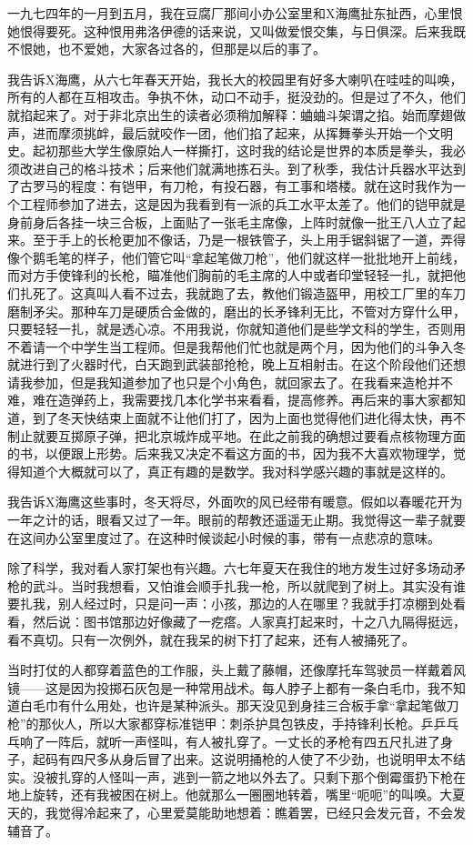 一九七四年的一月到五月，我在豆腐厂那间小办公室里和X海鹰扯东扯西，心里恨她恨得要死。这种恨用弗洛伊德的话来说，又叫做爱恨交集，与日俱深。后来我既不恨她，也不爱她，大家各过各的，但那是以后的事了。 

我告诉X海鹰，从六七年春天开始，我长大的校园里有好多大喇叭在哇哇的叫唤，所有的人都在互相攻击。争执不休，动口不动手，挺没劲的。但是过了不久，他们就掐起来了。对于非北京出生的读者必须稍加解释：蛐蛐斗架谓之掐。始而摩翅做声，进而摩须挑衅，最后就咬作一团，他们掐了起来，从挥舞拳头开始一个文明史。起初那些大学生像原始人一样撕打，这时我的结论是世界的本质是拳头，我必须改进自己的格斗技术；后来他们就满地拣石头。到了秋季，我估计兵器水平达到了古罗马的程度：有铠甲，有刀枪，有投石器，有工事和塔楼。就在这时我作为一个工程师参加了进去，这是因为我看到有一派的兵工水平太差了。他们的铠甲就是身前身后各挂一块三合板，上面贴了一张毛主席像，上阵时就像一批王八人立了起来。至于手上的长枪更加不像话，乃是一根铁管子，头上用手锯斜锯了一道，弄得像个鹅毛笔的样子，他们管它叫“拿起笔做刀枪”，他们就这样一批批地开上前线，而对方手使锋利的长枪，瞄准他们胸前的毛主席的人中或者印堂轻轻一扎，就把他们扎死了。这真叫人看不过去，我就跑了去，教他们锻造盔甲，用校工厂里的车刀磨制矛尖。那种车刀是硬质合金做的，磨出的长矛锋利无比，不管对方穿什么甲，只要轻轻一扎，就是透心凉。不用我说，你就知道他们是些学文科的学生，否则用不着请一个中学生当工程师。但是我帮他们忙也就是两个月，因为他们的斗争入冬就进行到了火器时代，白天跑到武装部抢枪，晚上互相射击。在这个阶段他们还想请我参加，但是我知道参加了也只是个小角色，就回家去了。在我看来造枪并不难，难在造弹药上，我需要找几本化学书来看看，提高修养。再后来的事大家都知道，到了冬天快结束上面就不让他们打了，因为上面也觉得他们进化得太快，再不制止就要互掷原子弹，把北京城炸成平地。在此之前我的确想过要看点核物理方面的书，以便跟上形势。后来我又决定不看这方面的书，因为我不大喜欢物理学，觉得知道个大概就可以了，真正有趣的是数学。我对科学感兴趣的事就是这样的。 

我告诉X海鹰这些事时，冬天将尽，外面吹的风已经带有暖意。假如以春暖花开为一年之计的话，眼看又过了一年。眼前的帮教还遥遥无止期。我觉得这一辈子就要在这间办公室里度过了。在这种时候谈起小时候的事，带有一点悲凉的意味。 

除了科学，我对看人家打架也有兴趣。六七年夏天在我住的地方发生过好多场动矛枪的武斗。当时我想看，又怕谁会顺手扎我一枪，所以就爬到了树上。其实没有谁要扎我，别人经过时，只是问一声：小孩，那边的人在哪里？我就手打凉棚到处看看，然后说：图书馆那边好像藏了一疙瘩。人家真打起来时，十之八九隔得挺远，看不真切。只有一次例外，就在我呆的树下打了起来，还有人被捅死了。 

当时打仗的人都穿着蓝色的工作服，头上戴了藤帽，还像摩托车驾驶员一样戴着风镜——这是因为投掷石灰包是一种常用战术。每人脖子上都有一条白毛巾，我不知道白毛巾有什么用处，也许是某种派头。那天没见到身挂三合板手拿“拿起笔做刀枪”的那伙人，所以大家都穿标准铠甲：刺杀护具包铁皮，手持锋利长枪。乒乒乓乓响了一阵后，就听一声怪叫，有人被扎穿了。一丈长的矛枪有四五尺扎进了身子，起码有四尺多从身后冒了出来。这说明捅枪的人使了不少劲，也说明甲太不结实。没被扎穿的人怪叫一声，逃到一箭之地以外去了。只剩下那个倒霉蛋扔下枪在地上旋转，还有我被困在树上。他就那么一圈圈地转着，嘴里“呃呃”的叫唤。大夏天的，我觉得冷起来了，心里爱莫能助地想着：瞧着罢，已经只会发元音，不会发辅音了。 


